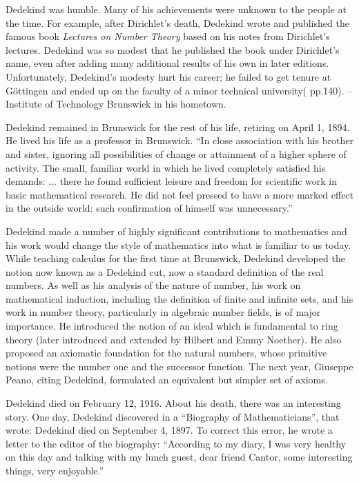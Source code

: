 \documentclass{article}
\begin{document}
Dedekind was humble. Many of his achievements were unknown to the people at the time. For example, after Dirichlet's death, Dedekind wrote and published the famous book {\em Lectures on Number Theory} based on his notes from Dirichlet's lectures. Dedekind was so modest that he published the book under Dirichlet’s name, even after adding many additional results of his own in later editions. Unfortunately, Dedekind’s modesty hurt his career; he failed to get tenure at Göttingen and ended up on the faculty of a minor technical university(\cite{StepanovRose15} pp.140). -- Institute of Technology Brunswick in his hometown.

Dedekind remained in Brunswick for the rest of his life, retiring on April 1, 1894. He lived his life as a professor in Brunswick.
``In close association with his brother and sister, ignoring all possibilities of change or attainment of a higher sphere of activity. The small, familiar world in which he lived completely satisfied his demands: ... there he found sufficient leisure and freedom for scientific work in basic mathematical research. He did not feel pressed to have a more marked effect in the outside world: such confirmation of himself was unnecessary.''

Dedekind made a number of highly significant contributions to mathematics and his work would change the style of mathematics into what is familiar to us today. While teaching calculus for the first time at Brunswick, Dedekind developed the notion now known as a Dedekind cut, now a standard definition of the real numbers. As well as his analysis of the nature of number, his work on mathematical induction, including the definition of finite and infinite sets, and his work in number theory, particularly in algebraic number fields, is of major importance. He introduced the notion of an ideal which is fundamental to ring theory (later introduced and extended by Hilbert and Emmy Noether). He also proposed an axiomatic foundation for the natural numbers, whose primitive notions were the number one and the successor function. The next year, Giuseppe Peano, citing Dedekind, formulated an equivalent but simpler set of axioms.

Dedekind died on February 12, 1916. About his death, there was an interesting story. One day, Dedekind discovered in a ``Biography of Mathematicians'', that wrote: Dedekind died on September 4, 1897. To correct this error, he wrote a letter to the editor of the biography: ``According to my diary, I was very healthy on this day and talking with my lunch guest, dear friend Cantor, some interesting things, very enjoyable.'' \cite{HanXueTao16}
\end{document}
